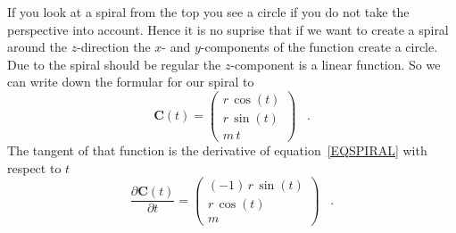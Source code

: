 If you look at a spiral from the top you see a circle if you do not take the perspective into account.
Hence it is no suprise that if we want to create a spiral around the $z$-direction the $x$- and $y$-components of the function create a circle.
Due to the spiral should be regular the $z$-component is a linear function.
So we can write down the formular for our spiral to
\begin{equation}
\label{EQSPIRAL}
\mathbf{C}(t) =
\left( 
\begin{array}{c}
r \, \cos(t) \\
r \, \sin(t) \\
m \, t
\end{array}
\right) \;\;\; .
\end{equation} 
The tangent of that function is the derivative of equation~\ref{EQSPIRAL} with respect to $t$
\begin{equation}
\label{EQTANGSPIRAL}
\frac{\partial\mathbf{C}(t)}{\partial t} =
\left( 
\begin{array}{c}
(-1) \, r \, \sin(t) \\
r \, \cos(t) \\
m 
\end{array}
\right) \;\;\; .
\end{equation} 
